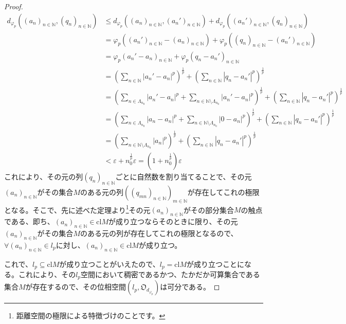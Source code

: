 \documentclass[dvipdfmx]{jsarticle}
\begin{document}
\begin{proof}
\begin{align*}
d_{\varphi_{p}}\left( \left( a_{n} \right)_{n \in \mathbb{N}},\left( q_{n} \right)_{n \in \mathbb{N}} \right) &\leq d_{\varphi_{p}}\left( \left( a_{n} \right)_{n \in \mathbb{N}},\left( a_{n}' \right)_{n \in \mathbb{N}} \right) + d_{\varphi_{p}}\left( \left( a_{n}' \right)_{n \in \mathbb{N}},\left( q_{n} \right)_{n \in \mathbb{N}} \right)\\
&= \varphi_{p}\left( \left( a_{n}' \right)_{n \in \mathbb{N}} - \left( a_{n} \right)_{n \in \mathbb{N}} \right) + \varphi_{p}\left( \left( q_{n} \right)_{n \in \mathbb{N}} - \left( a_{n}' \right)_{n \in \mathbb{N}} \right)\\
&= \varphi_{p}\left( a_{n}' - a_{n} \right)_{n \in \mathbb{N}} + \varphi_{p}\left( q_{n} - a_{n}' \right)_{n \in \mathbb{N}}\\
&= \left( \sum_{n \in \mathbb{N}} \left| a_{n}' - a_{n} \right|^{p} \right)^{\frac{1}{p}} + \left( \sum_{n \in \mathbb{N}} \left| q_{n} - a_{n}' \right|^{p} \right)^{\frac{1}{p}}\\
&= \left( \sum_{n \in \varLambda_{n_{0}}} \left| a_{n}' - a_{n} \right|^{p} + \sum_{n \in \mathbb{N} \setminus \varLambda_{n_{0}}} \left| a_{n}' - a_{n} \right|^{p} \right)^{\frac{1}{p}} + \left( \sum_{n \in \mathbb{N}} \left| q_{n} - a_{n}' \right|^{p} \right)^{\frac{1}{p}}\\
&= \left( \sum_{n \in \varLambda_{n_{0}}} \left| a_{n} - a_{n} \right|^{p} + \sum_{n \in \mathbb{N} \setminus \varLambda_{n_{0}}} \left| 0 - a_{n} \right|^{p} \right)^{\frac{1}{p}} + \left( \sum_{n \in \mathbb{N}} \left| q_{n} - a_{n}' \right|^{p} \right)^{\frac{1}{p}}\\
&= \left( \sum_{n \in \mathbb{N} \setminus \varLambda_{n_{0}}} \left| a_{n} \right|^{p} \right)^{\frac{1}{p}} + \left( \sum_{n \in \mathbb{N}} \left| q_{n} - a_{n}' \right|^{p} \right)^{\frac{1}{p}}\\
&< \varepsilon + n_{0}^{\frac{1}{p}}\varepsilon = \left( 1 + n_{0}^{\frac{1}{p}} \right)\varepsilon
\end{align*}
これにより、その元の列$\left( q_{n} \right)_{n \in \mathbb{N}}$ごとに自然数を割り当てることで、その元$\left( a_{n} \right)_{n \in \mathbb{N}}$がその集合$M$のある元の列$\left( \left( q_{mn} \right)_{n \in \mathbb{N}} \right)_{m \in \mathbb{N}}$が存在してこれの極限となる。そこで、先に述べた定理より\footnote{距離空間の極限による特徴づけのことです。}その元$\left( a_{n} \right)_{n \in \mathbb{N}}$がその部分集合$M$の触点である、即ち、$\left( a_{n} \right)_{n \in \mathbb{N}} \in {\mathrm{cl}}M$が成り立つならそのときに限り、その元$\left( a_{n} \right)_{n \in \mathbb{N}}$がその集合$M$のある元の列が存在してこれの極限となるので、$\forall\left( a_{n} \right)_{n \in \mathbb{N}} \in l_{p}$に対し、$\left( a_{n} \right)_{n \in \mathbb{N}} \in {\mathrm{cl}}M$が成り立つ。\par
これで、$l_{p} \subseteq {\mathrm{cl}}M$が成り立つことがいえたので、$l_{p} = {\mathrm{cl}}M$が成り立つことになる。これにより、その$l_{p}$空間において稠密であるかつ、たかだか可算集合である集合$M$が存在するので、その位相空間$\left( l_{p},\mathfrak{O}_{d_{\varphi_{p}}} \right)$は可分である。
\end{proof}
\end{document}
